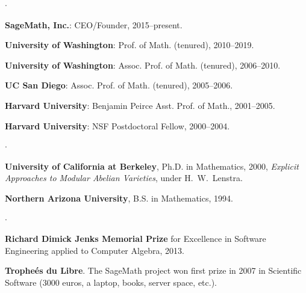 \documentclass[10pt]{article}
\newcommand{\ptitle}{\em}
\newenvironment{bulletlist}
   {
      \begin{list}
         {$\cdot$}
         {
            \setlength{\itemsep}{.5ex}
            \setlength{\parsep}{0ex}
            \setlength{\leftmargin}{2.2em}
            \setlength{\parskip}{0ex}
            \setlength{\topsep}{0ex}
         }
   }
   {
      \end{list}
   }
\newcounter{totalnumgrants}
\newenvironment{grants}
   {
   \begin{revnumerate}[\value{totalnumgrants}]
   {}
         {
            \setlength{\itemsep}{.5ex}
            \setlength{\parsep}{0ex}
            \setlength{\leftmargin}{0em}
            \setlength{\parskip}{0ex}
            \setlength{\topsep}{0ex}
         }
   }
   {
\end{revnumerate}
   }
\newcommand{\marginlabel}[1]{
\begin{minipage}[b]{0.8\labelwidth}{\large \textsf{\textbf{#1}}}\end{minipage}}
\newcommand{\entrylabel}[1]{\mbox{\marginlabel{#1}}\hfill}
\newcommand{\MainListlabel}[1]
   {
      \parbox[t]{\labelwidth}{\hspace{.8em}\marginlabel{#1}}
   }
\newenvironment{MainList}[1]
   {
      \renewcommand{\entrylabel}{\MainListlabel}
      \begin{list}{}
      {
         \renewcommand{\makelabel}{\entrylabel}
         \setlength   {\itemindent}{-.65em}
         \setlength   {\labelwidth}{#1}
         \setlength   {\leftmargin}{\labelwidth}
         \setlength   {\itemsep}{3ex}
      }
   }
   {
      \end{list}
   }
\begin{document}
\begin{MainList}{88pt}
\item [Employment]
\begin{bulletlist}
\item {\bf SageMath, Inc.}: CEO/Founder, 2015--present.
\item {\bf University of Washington}: Prof. of
Math. (tenured), 2010--2019.
\item {\bf University of Washington}: Assoc. Prof. of
Math. (tenured), 2006--2010.
\item {\bf UC San Diego}: Assoc. Prof. of Math. (tenured),
2005--2006.
\item {\bf Harvard University}: Benjamin Peirce Asst. Prof. of Math.,
  2001--2005.
\item {\bf Harvard University}: NSF Postdoctoral Fellow, 2000--2004.
\end{bulletlist}

\item [Education]
\begin{bulletlist}
\item {\bf University of California at Berkeley},
      Ph.D. in Mathematics, 2000,
{\ptitle Explicit Approaches to Modular Abelian Varieties},
under H.~W.~Lenstra.
\item {\bf Northern Arizona University},
     B.S. in Mathematics, 1994.
\end{bulletlist}

\item [Prizes]
\begin{bulletlist}
\item {\bf Richard Dimick Jenks
Memorial Prize} for Excellence in
Software Engineering applied to Computer Algebra, 2013.
\item {\bf Trophe\'es du Libre}. The SageMath project won first
  prize in 2007 in Scientific Software (3000 euros, a laptop,
  books, server space, etc.).
\end{bulletlist}



\item [Grants]
\begin{grants}


\end{grants}
\end{MainList}
\end{document}
